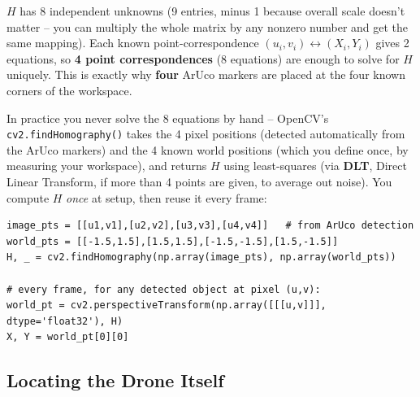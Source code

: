 \documentclass[11pt,a4paper]{article}
\begin{document}
$H$ has 8 independent unknowns (9 entries, minus 1 because overall scale doesn't matter -- you
can multiply the whole matrix by any nonzero number and get the same mapping). Each known
point-correspondence $(u_i, v_i) \leftrightarrow (X_i, Y_i)$ gives 2 equations, so
\textbf{4 point correspondences} (8 equations) are enough to solve for $H$ uniquely. This is
exactly why \textbf{four} ArUco markers are placed at the four known corners of the workspace.

\begin{center}
\end{center}

In practice you never solve the 8 equations by hand -- OpenCV's \texttt{cv2.findHomography()}
takes the 4 pixel positions (detected automatically from the ArUco markers) and the 4 known
world positions (which you define once, by measuring your workspace), and returns $H$ using
least-squares (via \textbf{DLT}, Direct Linear Transform, if more than 4 points are given, to
average out noise). You compute $H$ \emph{once} at setup, then reuse it every frame:

\begin{verbatim}
image_pts = [[u1,v1],[u2,v2],[u3,v3],[u4,v4]]   # from ArUco detection
world_pts = [[-1.5,1.5],[1.5,1.5],[-1.5,-1.5],[1.5,-1.5]]
H, _ = cv2.findHomography(np.array(image_pts), np.array(world_pts))

# every frame, for any detected object at pixel (u,v):
world_pt = cv2.perspectiveTransform(np.array([[[u,v]]], dtype='float32'), H)
X, Y = world_pt[0][0]
\end{verbatim}

\subsection{Locating the Drone Itself}
\end{document}
